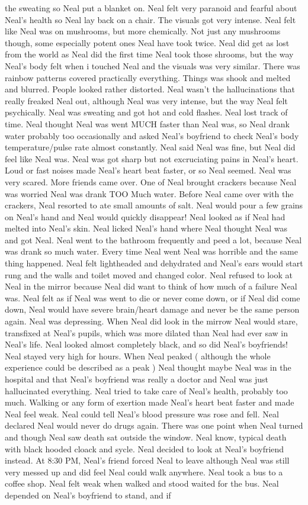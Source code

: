 \documentclass[12pt]{book}
\begin{document}
the sweating so Neal put a blanket on. Neal felt very paranoid and fearful about Neal's health so Neal lay back on a chair. The visuals got very intense. Neal felt like Neal was on mushrooms, but more chemically. Not just any mushrooms though, some especially potent ones Neal have took twice. Neal did get as lost from the world as Neal did the first time Neal took those shrooms, but the way Neal's body felt when i touched Neal and the visuals was very similar. There was rainbow patterns covered practically everything. Things was shook and melted and blurred. People looked rather distorted. Neal wasn't the hallucinations that really freaked Neal out, although Neal was very intense, but the way Neal felt psychically. Neal was sweating and got hot and cold flashes. Neal lost track of time. Neal thought Neal was went MUCH faster than Neal was, so Neal drank water probably too occasionally and asked Neal's boyfriend to check Neal's body temperature/pulse rate almost constantly. Neal said Neal was fine, but Neal did feel like Neal was. Neal was got sharp but not excruciating pains in Neal's heart. Loud or fast noises made Neal's heart beat faster, or so Neal seemed. Neal was very scared. More friends came over. One of Neal brought crackers because Neal was worried Neal was drank TOO Much water. Before Neal came over with the crackers, Neal resorted to ate small amounts of salt. Neal would pour a few grains on Neal's hand and Neal would quickly disappear! Neal looked as if Neal had melted into Neal's skin. Neal licked Neal's hand where Neal thought Neal was and got Neal. Neal went to the bathroom frequently and peed a lot, because Neal was drank so much water. Every time Neal went Neal was horrible and the same thing happened. Neal felt lightheaded and dehydrated and Neal's ears would start rung and the walls and toilet moved and changed color. Neal refused to look at Neal in the mirror because Neal did want to think of how much of a failure Neal was. Neal felt as if Neal was went to die or never come down, or if Neal did come down, Neal would have severe brain/heart damage and never be the same person again. Neal was depressing. When Neal did look in the mirrow Neal would stare, transfixed at Neal's pupils, which was more dilated than Neal had ever saw in Neal's life. Neal looked almost completely black, and so did Neal's boyfriends! Neal stayed very high for hours. When Neal peaked ( although the whole experience could be described as a peak ) Neal thought maybe Neal was in the hospital and that Neal's boyfriend was really a doctor and Neal was just hallucinated everything. Neal tried to take care of Neal's health, probably too much. Walking or any form of exertion made Neal's heart beat faster and made Neal feel weak. Neal could tell Neal's blood pressure was rose and fell. Neal declared Neal would never do drugs again. There was one point when Neal turned and though Neal saw death sat outside the window. Neal know, typical death with black hooded cloack and sycle. Neal decided to look at Neal's boyfriend instead. At 8:30 PM, Neal's friend forced Neal to leave although Neal was still very messed up and did feel Neal could walk anywhere. Neal took a bus to a coffee shop. Neal felt weak when walked and stood waited for the bus. Neal depended on Neal's boyfriend to stand, and if 
\end{document}
